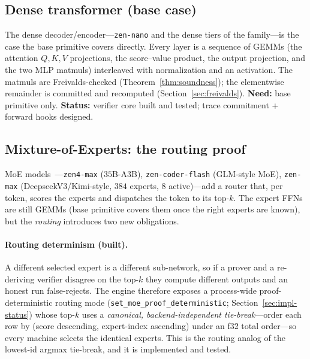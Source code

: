 \subsection{Dense transformer (base case)}

The dense decoder/encoder---\texttt{zen-nano} and the dense tiers of the family---is the
case the base primitive covers directly. Every layer is a sequence of GEMMs (the
attention $Q,K,V$ projections, the score--value product, the output projection, and the
two MLP matmuls) interleaved with normalization and an activation. The matmuls are
Freivalds-checked (Theorem~\ref{thm:soundness}); the elementwise remainder is committed
and recomputed (Section~\ref{sec:freivalds}). \textbf{Need:} base primitive only.
\textbf{Status:} verifier core built and tested; trace commitment + forward hooks
designed.

\subsection{Mixture-of-Experts: the routing proof}
\label{sec:moe-proof}

MoE models~\cite{shazeer2017moe}---\texttt{zen4-max} ($35$B-A3B), \texttt{zen-coder-flash}
(GLM-style MoE), \texttt{zen-max} (DeepseekV3/Kimi-style, $384$ experts, $8$ active)---add a
router that, per token, scores the experts and dispatches the token to its top-$k$. The expert FFNs
are still GEMMs (base primitive covers them once the right experts are known), but the
\emph{routing} introduces two new obligations.

\paragraph{Routing determinism (built).} A different selected expert is a different
sub-network, so if a prover and a re-deriving verifier disagree on the top-$k$ they
compute different outputs and an honest run false-rejects. The engine therefore exposes
a process-wide proof-deterministic routing mode (\texttt{set\_moe\_proof\_deterministic};
Section~\ref{sec:impl-status}) whose top-$k$ uses a \emph{canonical, backend-independent
tie-break}---order each row by (score descending, expert-index ascending) under an f32
total order---so every machine selects the identical experts. This is the routing analog
of the lowest-id argmax tie-break, and it is implemented and tested.


